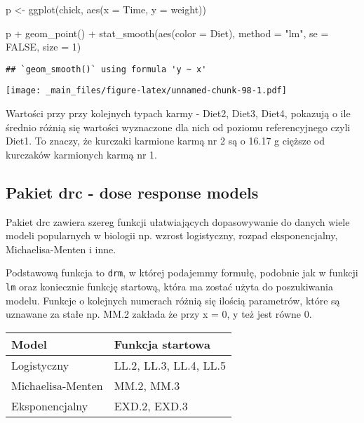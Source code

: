 \documentclass[
]{book}
\newenvironment{Shaded}{\begin{snugshade}}{\end{snugshade}}
\newcommand{\AttributeTok}[1]{\textcolor[rgb]{0.77,0.63,0.00}{#1}}
\newcommand{\ConstantTok}[1]{\textcolor[rgb]{0.00,0.00,0.00}{#1}}
\newcommand{\DecValTok}[1]{\textcolor[rgb]{0.00,0.00,0.81}{#1}}
\newcommand{\FunctionTok}[1]{\textcolor[rgb]{0.00,0.00,0.00}{#1}}
\newcommand{\NormalTok}[1]{#1}
\newcommand{\OtherTok}[1]{\textcolor[rgb]{0.56,0.35,0.01}{#1}}
\newcommand{\SpecialCharTok}[1]{\textcolor[rgb]{0.00,0.00,0.00}{#1}}
\newcommand{\StringTok}[1]{\textcolor[rgb]{0.31,0.60,0.02}{#1}}
\begin{document}
\begin{Shaded}
\begin{Highlighting}[]
\NormalTok{p }\OtherTok{\textless{}{-}} \FunctionTok{ggplot}\NormalTok{(chick, }\FunctionTok{aes}\NormalTok{(}\AttributeTok{x =}\NormalTok{ Time, }\AttributeTok{y =}\NormalTok{ weight))}

\NormalTok{p }\SpecialCharTok{+} \FunctionTok{geom\_point}\NormalTok{() }\SpecialCharTok{+} \FunctionTok{stat\_smooth}\NormalTok{(}\FunctionTok{aes}\NormalTok{(}\AttributeTok{color =}\NormalTok{ Diet), }\AttributeTok{method =} \StringTok{"lm"}\NormalTok{, }\AttributeTok{se =} \ConstantTok{FALSE}\NormalTok{, }\AttributeTok{size =} \DecValTok{1}\NormalTok{)}
\end{Highlighting}
\end{Shaded}

\begin{verbatim}
## `geom_smooth()` using formula 'y ~ x'
\end{verbatim}

\texttt{[image: \_main\_files/figure-latex/unnamed-chunk-98-1.pdf]}

Wartości przy przy kolejnych typach karmy - Diet2, Diet3, Diet4, pokazują o ile średnio różnią się wartości wyznaczone dla nich od poziomu referencyjnego czyli Diet1. To znaczy, że kurczaki karmione karmą nr 2 są o 16.17 g cięższe od kurczaków karmionych karmą nr 1.

\hypertarget{pakiet-drc---dose-response-models}{%
\subsection{Pakiet drc - dose response models}\label{pakiet-drc---dose-response-models}}

Pakiet drc zawiera szereg funkcji ułatwiających dopasowywanie do danych wiele modeli popularnych w biologii np. wzrost logistyczny, rozpad eksponencjalny, Michaelisa-Menten i inne.

Podstawową funkcja to \texttt{drm}, w której podajemmy formułę, podobnie jak w funkcji \texttt{lm} oraz koniecznie funkcję startową, która ma zostać użyta do poszukiwania modelu. Funkcje o kolejnych numerach różnią się ilością parametrów, które są uznawane za stałe np. MM.2 zakłada że przy x = 0, y też jest równe 0.

\begin{longtable}[]{@{}ll@{}}
\toprule
Model & Funkcja startowa \\
\midrule
\endhead
Logistyczny & LL.2, LL.3, LL.4, LL.5 \\
Michaelisa-Menten & MM.2, MM.3 \\
Eksponencjalny & EXD.2, EXD.3 \\
\bottomrule
\end{longtable}
\end{document}
